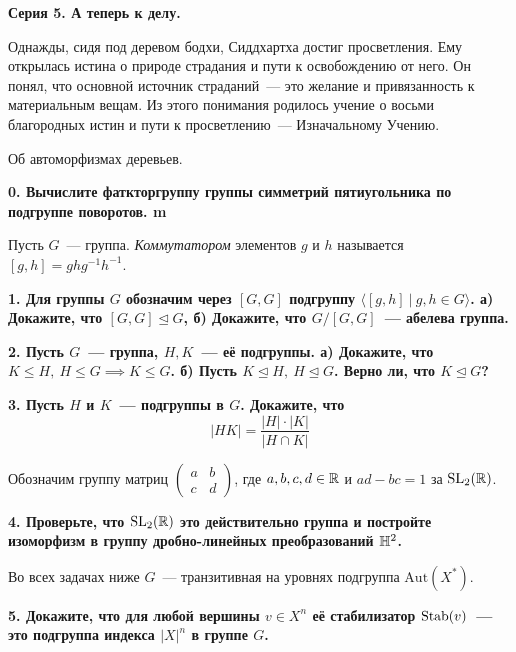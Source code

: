 \documentclass[9pt]{extarticle}
\begin{document}
	\begin{landscape}

	\pagestyle{empty}
	\begin{multicols}{2}

	\centerline{\bf{Серия 5. А теперь к делу. }}

	\epigraph{Однажды, сидя под деревом бодхи, Сиддхартха достиг просветления. Ему открылась истина о природе страдания и пути к освобождению от него. Он понял, что основной источник страданий~--- это желание и привязанность к материальным вещам. Из этого понимания родилось учение о восьми благородных истин и пути к просветлению~--- Изначальному Учению.}{Об автоморфизмах деревьев.}

	\bf{0.}  Вычислите фаткторгруппу группы симметрий пятиугольника по подгруппе поворотов. m

	\begin{definition} 
		Пусть $G$~--- группа. \emph{Коммутатором} элементов $g$ и $h$ называется $[g, h] = g h g^{-1} h^{-1}$.
	\end{definition}

	\bf{1.} Для группы $G$ обозначим через $[G, G]$ подгруппу $\langle [g, h] \ \vert \ g, h \in G \rangle$. а) Докажите, что $[G, G] \trianglelefteq G$, б) Докажите, что $G/[G, G]$~--- абелева группа. 

	\bf{2.} Пусть $G$~--- группа, $H, K$~--- её подгруппы. а) Докажите, что $K \le H, \ H \le G \implies K \le G$. б) Пусть $K \trianglelefteq  H, \ H \trianglelefteq  G$. Верно ли, что $K \trianglelefteq  G$?

	\bf{3.} Пусть $H$ и $K$~--- подгруппы в $G$. Докажите, что 
	\[
		|HK| = \frac{|H|\cdot|K|}{|H \cap K|}	
	\]
	\begin{definition} 
		Обозначим группу матриц $\begin{pmatrix} a & b \\ c & d \end{pmatrix}$, где $a, b, c, d \in \mathbb{R}$ и $ad - bc = 1$ за $\mathrm{SL}_{2}(\mathbb{R})$.
	\end{definition}

	\bf{4.} Проверьте, что $\mathrm{SL}_{2}(\mathbb{R})$ это действительно группа и постройте изоморфизм в группу дробно-линейных преобразований $\mathbb{H}^2$. 

	Во всех задачах ниже $G$~--- транзитивная на уровнях подгруппа $\mathrm{Aut}(X^*)$.

	\bf{5.}  Докажите, что для любой вершины $v \in X^n$ её стабилизатор  $\operatorname{Stab}(v)$~--- это подгруппа индекса $|X|^n$ в группе $G$. 


\end{multicols}
\end{landscape}
\end{document}

